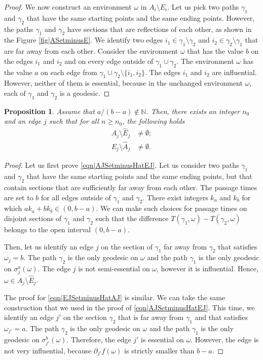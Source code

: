 \documentclass[reqno]{amsart}
\newtheorem{proposition}{Proposition}
\begin{document}
\begin{proof}
We now construct an environment $\omega$ in $A_i\setminus E_i$.
Let us pick two paths $\gamma_1$ and $\gamma_2$ that have the same starting points and the same ending points. However, the paths $\gamma_1$ and $\gamma_2$ have sections that are reflections of each other, as shown in the Figure \ref{fig|ASetminusE}. We identify two edges $i_1\in\gamma_1\setminus \gamma_2$ and $i_2\in \gamma_2\setminus \gamma_1$ that are far away from each other. Consider the environment $\omega$ that has the value $b$ on the edges $i_1$ and $i_2$ and on every edge outside of $\gamma_1\cup \gamma_2$. The environment $\omega$ has the value $a$ on each edge from $\gamma_1\cup\gamma_2\setminus\{i_1,i_2\}$. 
The edges $i_1$ and $i_2$ are influential. However, neither of them is essential, because in the unchanged environment $\omega$, each of $\gamma_1$ and $\gamma_2$ is a geodesic.
\end{proof}

\begin{proposition}\label{thm|ABGeneral}
Assume that $a/(b-a)\not\in\mathbb N$.
Then, there exists an integer $n_0$ and an edge $j$ such that for all $n\geq n_0$, the following holds
\begin{align}
A_j\setminus \hat E_j&\neq \emptyset; \label{eqn|AJSetminusHatEJ}
\\
E_j\setminus \hat A_j&\neq \emptyset. \label{eqn|EJSetminusHatAJ}
\end{align}
\end{proposition}
\begin{proof}
Let us first prove \eqref{eqn|AJSetminusHatEJ}. Let us consider two paths $\gamma_1$ and $\gamma_2$ that have the same starting points and the same ending points, but that contain sections that are sufficiently far away from each other. The passage times are set to $b$ for all edges outside of $\gamma_1$ and $\gamma_2$.
There exist integers $k_a$ and $k_b$ for which 
$ak_a+bk_b\in (0,b-a)$. We can make such choices for passage times on disjoint sections of $\gamma_1$ and $\gamma_2$ such that the difference $T(\gamma_1,\omega)-T(\gamma_2,\omega)$ belongs to the open interval $(0,b-a)$. 

Then, let us identify an edge $j$ on the section of $\gamma_1$ far away from $\gamma_2$ that satisfies $\omega_j=b$. The path $\gamma_2$ is the only geodesic on $\omega$ and the path $\gamma_1$ is the only geodesic on $\sigma_j^a(\omega)$. The edge $j$ is not semi-essential on $\omega$, however it is influential. Hence, $\omega\in A_j\setminus \hat E_j$. 

The proof for \eqref{eqn|EJSetminusHatAJ} is similar. We can take the same construction that we used in the proof of \eqref{eqn|AJSetminusHatEJ}. This time, we identify an edge $j'$ on the section $\gamma_2$ that is far away from $\gamma_1$ and that satisfies $\omega_{j'}=a$. The path $\gamma_2$ is the only geodesic on $\omega$ and the path $\gamma_1$ is the only geodesic on $\sigma_{j'}^b(\omega)$. Therefore, the edge $j'$ is essential on $\omega$. However, the edge is not very influential, because $\partial_{j'}f(\omega)$ is strictly smaller than $b-a$.  
\end{proof}
\end{document}
